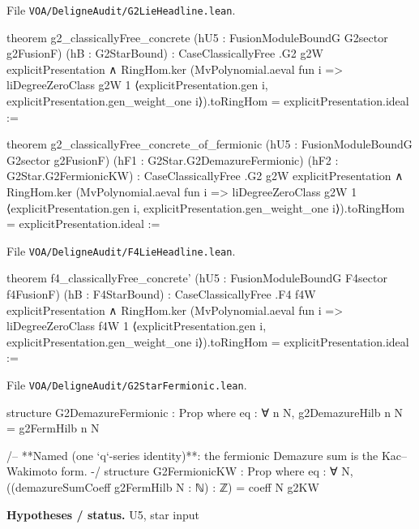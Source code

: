 \documentclass[11pt,openany]{book}
\newcommand{\leanpath}[1]{\texttt{\small #1}}
\theoremstyle{definition}
\theoremstyle{plain}
\begin{document}
{\raggedright\noindent File \leanpath{VOA/\allowbreak DeligneAudit/\allowbreak G2LieHeadline.lean}.\par}
\begin{leancode}
theorem g2_classicallyFree_concrete (hU5 : FusionModuleBoundG G2sector g2FusionF)
    (hB : G2StarBound) :
    CaseClassicallyFree .G2 g2W explicitPresentation ∧
      RingHom.ker (MvPolynomial.aeval fun i =>
        liDegreeZeroClass g2W 1 ⟨explicitPresentation.gen i,
          explicitPresentation.gen_weight_one i⟩).toRingHom = explicitPresentation.ideal :=
\end{leancode}
\begin{leancode}
theorem g2_classicallyFree_concrete_of_fermionic (hU5 : FusionModuleBoundG G2sector g2FusionF)
    (hF1 : G2Star.G2DemazureFermionic) (hF2 : G2Star.G2FermionicKW) :
    CaseClassicallyFree .G2 g2W explicitPresentation ∧
      RingHom.ker (MvPolynomial.aeval fun i =>
        liDegreeZeroClass g2W 1 ⟨explicitPresentation.gen i,
          explicitPresentation.gen_weight_one i⟩).toRingHom = explicitPresentation.ideal :=
\end{leancode}
{\raggedright\noindent File \leanpath{VOA/\allowbreak DeligneAudit/\allowbreak F4LieHeadline.lean}.\par}
\begin{leancode}
theorem f4_classicallyFree_concrete' (hU5 : FusionModuleBoundG F4sector f4FusionF)
    (hB : F4StarBound) :
    CaseClassicallyFree .F4 f4W explicitPresentation ∧
      RingHom.ker (MvPolynomial.aeval fun i =>
        liDegreeZeroClass f4W 1 ⟨explicitPresentation.gen i,
          explicitPresentation.gen_weight_one i⟩).toRingHom = explicitPresentation.ideal :=
\end{leancode}
{\raggedright\noindent File \leanpath{VOA/\allowbreak DeligneAudit/\allowbreak G2StarFermionic.lean}.\par}
\begin{leancode}
structure G2DemazureFermionic : Prop where
  eq : ∀ n N, g2DemazureHilb n N = g2FermHilb n N

/-- **Named (one `q`-series identity)**: the fermionic Demazure sum is the Kac–Wakimoto form. -/
structure G2FermionicKW : Prop where
  eq : ∀ N, ((demazureSumCoeff g2FermHilb N : ℕ) : ℤ) = coeff N g2KW
\end{leancode}
\noindent\textbf{Hypotheses / status.} U5, star input\par
\medskip
\endgroup
\setcounter{chapter}{27}
\end{document}
